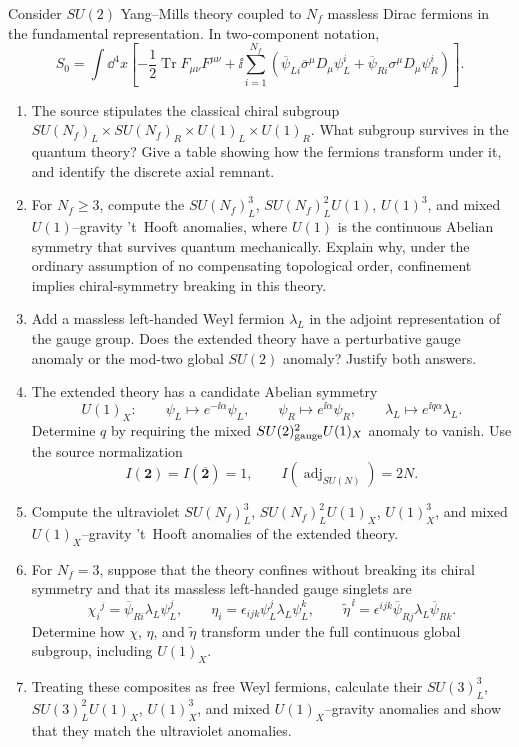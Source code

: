 \begin{enumerate}
  Consider \(SU(2)\) Yang--Mills theory coupled to \(N_f\) massless Dirac
  fermions in the fundamental representation.  In two-component notation,
  \[
    S_0=\int \dd^4x\left[-\frac12\operatorname{Tr}F_{\mu\nu}F^{\mu\nu}
      +\ii\sum_{i=1}^{N_f}\left(
        \overline\psi_{L i}\overline\sigma^\mu D_\mu\psi_L^i
       +\overline\psi_{R i}\sigma^\mu D_\mu\psi_R^i\right)\right].
  \]
  \begin{enumerate}
    \item[(i)]
    The source stipulates the classical chiral subgroup
    \(SU(N_f)_L\times SU(N_f)_R\times U(1)_L\times U(1)_R\).
    What subgroup survives in the quantum theory?  Give a table showing
    how the fermions transform under it, and identify the discrete axial
    remnant.
    \item[(ii)]
    For \(N_f\ge3\), compute the
    \(SU(N_f)_L^3\), \(SU(N_f)_L^2U(1)\), \(U(1)^3\), and mixed
    \(U(1)\)--gravity 't~Hooft anomalies, where \(U(1)\) is the continuous
    Abelian symmetry that survives quantum mechanically.  Explain why,
    under the ordinary assumption of no compensating topological order,
    confinement implies chiral-symmetry breaking in this theory.
    \item[(iii)]
    Add a massless left-handed Weyl fermion \(\lambda_L\) in the adjoint
    representation of the gauge group.  Does the extended theory have a
    perturbative gauge anomaly or the mod-two global \(SU(2)\) anomaly?
    Justify both answers.
    \item[(iv)]
    The extended theory has a candidate Abelian symmetry
    \[
      U(1)_X:\qquad
      \psi_L\mapsto e^{-\ii\alpha}\psi_L,\qquad
      \psi_R\mapsto e^{\ii\alpha}\psi_R,\qquad
      \lambda_L\mapsto e^{\ii q\alpha}\lambda_L.
    \]
    Determine \(q\) by requiring the mixed
    \(SU(2)_{\rm gauge}^2U(1)_X\) anomaly to vanish.  Use the source
    normalization
    \[
      I(\mathbf2)=I(\overline{\mathbf2})=1,
      \qquad I(\operatorname{adj}_{SU(N)})=2N.
    \]
    \item[(v)]
    Compute the ultraviolet \(SU(N_f)_L^3\),
    \(SU(N_f)_L^2U(1)_X\), \(U(1)_X^3\), and mixed
    \(U(1)_X\)--gravity 't~Hooft anomalies of the extended theory.
    \item[(vi)]
    For \(N_f=3\), suppose that the theory confines without breaking its
    chiral symmetry and that its massless left-handed gauge singlets are
    \[
      \chi_i{}^j=\overline\psi_{R i}\lambda_L\psi_L^j,
      \qquad
      \eta_i=\epsilon_{ijk}\psi_L^j\lambda_L\psi_L^k,
      \qquad
      \widetilde\eta^{\,\ii}
       =\epsilon^{ijk}\overline\psi_{R j}\lambda_L
          \overline\psi_{R k}.
    \]
    Determine how \(\chi\), \(\eta\), and \(\widetilde\eta\) transform
    under the full continuous global subgroup, including \(U(1)_X\).
    \item[(vii)]
    Treating these composites as free Weyl fermions, calculate their
    \(SU(3)_L^3\), \(SU(3)_L^2U(1)_X\), \(U(1)_X^3\), and mixed
    \(U(1)_X\)--gravity anomalies and show that they match the ultraviolet
    anomalies.
  \end{enumerate}


\end{enumerate}
